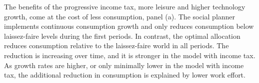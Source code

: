 The benefits of the progressive income tax, more leisure and higher technology growth, come at the cost of less consumption, panel (a). 
 The social planner implements continuous consumption growth and only reduces consumption below laissez-faire levels during the first periods. In contrast, the optimal allocation reduces consumption relative to the laissez-faire world in all periods. The reduction is increasing over time, %
  and it is stronger in the model with income tax. As growth rates are higher, or only minimally lower in the model with income tax, the additional reduction in consumption is explained by lower work effort. %

